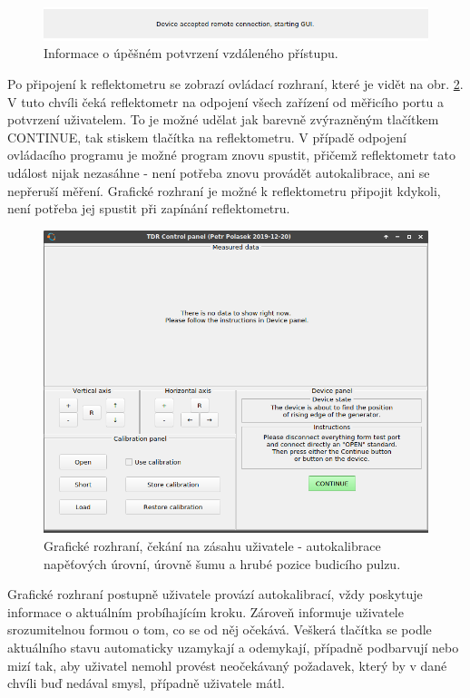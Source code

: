 \begin{figure}[H]
\includegraphics[width=\textwidth,keepaspectratio]{images/gui/serial_accepted_cut.png}\caption{Informace o úpěšném potvrzení vzdáleného přístupu.}\label{serial_accepted}
\end{figure}

Po připojení k reflektometru se zobrazí ovládací rozhraní, které je vidět na obr. \ref{gui_edge_wait}. V tuto chvíli čeká reflektometr na odpojení všech zařízení od měřicího portu a potvrzení uživatelem. To je možné udělat jak barevně zvýrazněným tlačítkem CONTINUE, tak stiskem tlačítka na reflektometru. V případě odpojení ovládacího programu je možné program znovu spustit, přičemž reflektometr tato událost nijak nezasáhne - není potřeba znovu provádět autokalibrace, ani se nepřeruší měření. Grafické rozhraní je možné k reflektometru připojit kdykoli, není potřeba jej spustit při zapínání reflektometru.
\begin{figure}[htbp]
\includegraphics[width=\textwidth,keepaspectratio]{images/gui/edge_wait.png}\caption{Grafické rozhraní, čekání na zásahu uživatele - autokalibrace napěťových úrovní, úrovně šumu a hrubé pozice budicího pulzu.}\label{gui_edge_wait}
\end{figure}

Grafické rozhraní postupně uživatele provází autokalibrací, vždy poskytuje informace o aktuálním probíhajícím kroku. Zároveň informuje uživatele srozumitelnou formou o tom, co se od něj očekává. Veškerá tlačítka se podle aktuálního stavu automaticky uzamykají a odemykají, případně podbarvují nebo mizí tak, aby uživatel nemohl provést neočekávaný požadavek, který by v dané chvíli buď nedával smysl, případně uživatele mátl.

